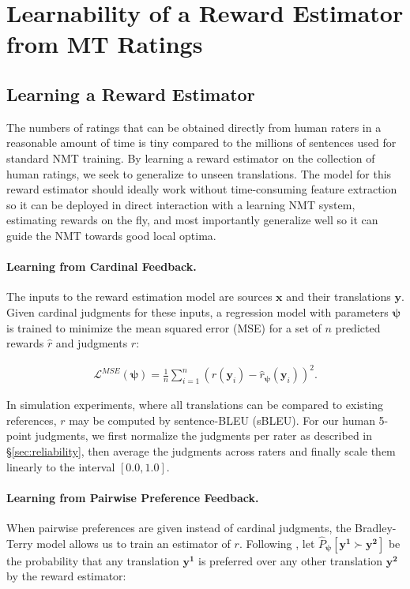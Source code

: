\section{Learnability of a Reward Estimator from MT Ratings}
\label{sec:learnability}

\subsection{Learning a Reward Estimator} The numbers of ratings that can be obtained directly from human raters in a reasonable amount of time is tiny compared to the millions of sentences used for standard NMT training. By learning a reward estimator on the collection of human ratings, we seek to generalize to unseen translations. The model for this reward estimator should ideally work without time-consuming feature extraction so it can be deployed in direct interaction with a learning NMT system, estimating rewards on the fly, and most importantly generalize well so it can guide the NMT towards good local optima. 

\paragraph{Learning from Cardinal Feedback.} The inputs to the reward estimation model are sources $\mathbf{x}$ and their translations $\mathbf{y}$. Given cardinal judgments for these inputs, a regression model with parameters $\boldsymbol \psi$ is trained to minimize the mean squared error (MSE) for a set of $n$ predicted rewards $\hat{r}$ and judgments $r$:

\begin{align*}
\mathcal{L}^{MSE}(\boldsymbol \psi) = \frac{1}{n}\sum^n_{i=1}(r(\mathbf{y}_i) -\hat{r}_{\boldsymbol \psi}(\mathbf{y}_i))^2.
\end{align*}

In simulation experiments, where all translations can be compared to existing references, $r$ may be computed by sentence-BLEU (sBLEU). For our human 5-point judgments, we first normalize the judgments per rater as described in §\ref{sec:reliability}, then average the judgments across raters and finally scale them linearly to the interval $[0.0, 1.0]$.

\paragraph{Learning from Pairwise Preference Feedback.} When pairwise preferences are given instead of cardinal judgments, the Bradley-Terry model allows us to train an estimator of $r$. Following \citet{ChristianoETAL:17}, let $\hat{P}_{\boldsymbol \psi}[\mathbf{y^1} \succ \mathbf{y^2}]$ be the probability that any translation $\mathbf{y^1}$ is preferred over any other translation $\mathbf{y^2}$ by the reward estimator:

